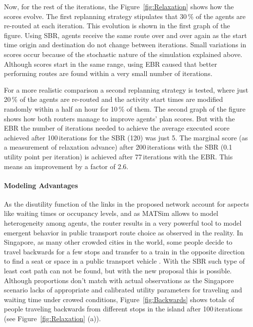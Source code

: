 Now, for the rest of the iterations, the Figure~\ref{fig:Relaxation} shows how the scores evolve. The first replanning strategy stipulates that 30\,\% of the agents are re-routed at each iteration. This evolution is shown in the first graph of the figure. Using SBR, agents receive the same route over and over again as the start time origin and destination do not change between iterations. Small variations in scores occur because of the stochastic nature of the simulation explained above. Although scores start in the same range, using EBR caused that better performing routes are found within a very small number of iterations.

For a more realistic comparison a second replanning strategy is tested, where just 20\,\% of the agents are re-routed and the activity start times are modified randomly within a half an hour for 10\,\% of them. The second graph of the figure shows how both routers manage to improve agents' plan scores. But with the EBR the number of iterations needed to achieve the average executed score achieved after 100\,iterations for the SBR (120) was just 5. The marginal score (as a measurement of relaxation advance) after 200\,iterations with the SBR (0.1\,utility point per iteration) is achieved after 77\,iterations with the EBR. This means an improvement by a factor of 2.6.

\paragraph{Modeling Advantages}

As the disutility function of the links in the proposed network account for aspects like waiting times or occupancy levels, and as MATSim allows to model heterogeneity among agents, the router results in a very powerful tool to model emergent behavior in public transport route choice as observed in the reality. In Singapore, as many other crowded cities in the world, some people decide to travel backwards for a few stops and transfer to a train in the opposite direction to find a seat or space in a public transport vehicle \cite{ChakirovErath_HKSTS_2011}. With the SBR such type of least cost path can not be found, but with the new proposal this is possible. Although proportions don't match with actual observations as the Singapore scenario lacks of appropriate and calibrated utility parameters for traveling and waiting time under crowed conditions, Figure~\ref{fig:Backwards} shows totals of people traveling backwards from different stops in the island after 100\,iterations (see Figure~\ref{fig:Relaxation} (a)).

